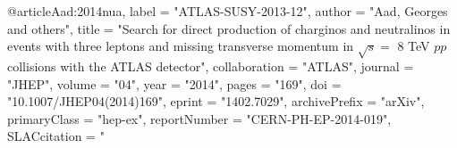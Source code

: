 @article{Aad:2014nua,
      label          = "ATLAS-SUSY-2013-12",
      author         = "Aad, Georges and others",
      title          = "{Search for direct production of charginos and
                        neutralinos in events with three leptons and missing
                        transverse momentum in $\sqrt{s} =$ 8 TeV $pp$ collisions
                        with the ATLAS detector}",
      collaboration  = "ATLAS",
      journal        = "JHEP",
      volume         = "04",
      year           = "2014",
      pages          = "169",
      doi            = "10.1007/JHEP04(2014)169",
      eprint         = "1402.7029",
      archivePrefix  = "arXiv",
      primaryClass   = "hep-ex",
      reportNumber   = "CERN-PH-EP-2014-019",
      SLACcitation   = "%
}

